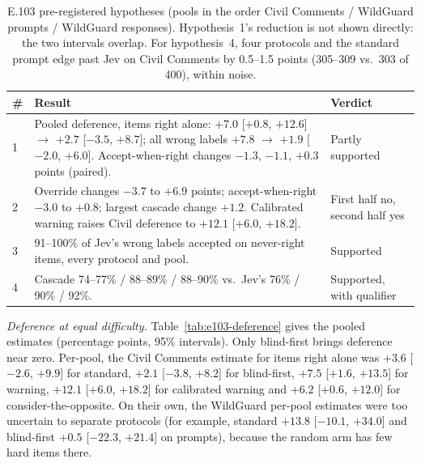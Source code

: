 \documentclass[11pt]{article}
\renewcommand{\_}{\origunderscore\allowbreak}
\begin{document}
\begin{table}[H]
\centering
\small
\begin{tabularx}{\textwidth}{@{}lXl@{}}
\toprule
\# & Result & Verdict \\
\midrule
1 & Pooled deference, items right alone: $+7.0$ [$+0.8$, $+12.6$] $\rightarrow$ $+2.7$ [$-3.5$, $+8.7$]; all wrong labels $+7.8$ $\rightarrow$ $+1.9$ [$-2.0$, $+6.0$]. Accept-when-right changes $-1.3$, $-1.1$, $+0.3$ points (paired). & Partly supported \\
2 & Override changes $-3.7$ to $+6.9$ points; accept-when-right $-3.0$ to $+0.8$; largest cascade change $+1.2$. Calibrated warning raises Civil deference to $+12.1$ [$+6.0$, $+18.2$]. & First half no, second half yes \\
3 & 91--100\% of Jev's wrong labels accepted on never-right items, every protocol and pool. & Supported \\
4 & Cascade 74--77\% / 88--89\% / 88--90\% vs.\ Jev's 76\% / 90\% / 92\%. & Supported, with qualifier \\
\bottomrule
\end{tabularx}
\caption{E.103 pre-registered hypotheses (pools in the order Civil Comments / WildGuard prompts / WildGuard responses). Hypothesis~1's reduction is not shown directly: the two intervals overlap. For hypothesis~4, four protocols and the standard prompt edge past Jev on Civil Comments by 0.5--1.5 points (305--309 vs.\ 303 of 400), within noise.}
\label{tab:e103-hyp}
\end{table}

\emph{Deference at equal difficulty.} Table~\ref{tab:e103-deference} gives the pooled estimates (percentage points, 95\% intervals). Only blind-first brings deference near zero. Per-pool, the Civil Comments estimate for items right alone was $+3.6$ [$-2.6$, $+9.9$] for standard, $+2.1$ [$-3.8$, $+8.2$] for blind-first, $+7.5$ [$+1.6$, $+13.5$] for warning, $+12.1$ [$+6.0$, $+18.2$] for calibrated warning and $+6.2$ [$+0.6$, $+12.0$] for consider-the-opposite. On their own, the WildGuard per-pool estimates were too uncertain to separate protocols (for example, standard $+13.8$ [$-10.1$, $+34.0$] and blind-first $+0.5$ [$-22.3$, $+21.4$] on prompts), because the random arm has few hard items there.
\end{document}
